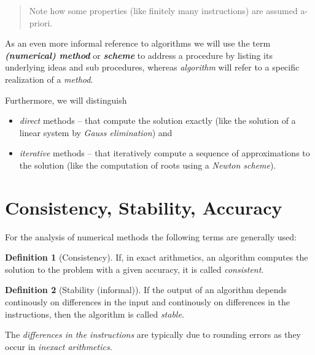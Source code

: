 \documentclass[
]{book}
\providecommand{\tightlist}{%
  \setlength{\itemsep}{0pt}\setlength{\parskip}{0pt}}
\newenvironment {JHSAYS} [0] {\begin{quote}\color{jhsc}} {\end{quote}}
\theoremstyle{definition}
\newtheorem{definition}{Definition}[chapter]
\theoremstyle{definition}
\theoremstyle{definition}
\theoremstyle{definition}
\theoremstyle{remark}
\begin{document}
\leavevmode\hypertarget{rem-coors}{}%
\begin{JHSAYS}
Note how some properties (like finitely many instructions) are assumed a-priori.

\end{JHSAYS}

As an even more informal reference to algorithms we will use the term \textbf{\emph{(numerical) method}} or \textbf{\emph{scheme}} to address a procedure by listing its underlying ideas and sub procedures, whereas \emph{algorithm} will refer to a specific realization of a \emph{method}.

Furthermore, we will distinguish

\begin{itemize}
\tightlist
\item
  \emph{direct} methods -- that compute the solution exactly (like the solution of a linear system by \emph{Gauss elimination}) and
\item
  \emph{iterative} methods -- that iteratively compute a sequence of approximations to the solution (like the computation of roots using a \emph{Newton scheme}).
\end{itemize}

\hypertarget{consistency-stability-accuracy}{%
\section{Consistency, Stability, Accuracy}\label{consistency-stability-accuracy}}

For the analysis of numerical methods the following terms are generally used:

\begin{definition}[Consistency]
\protect\hypertarget{def:consistency}{}\label{def:consistency}If, in exact arithmetics, an algorithm computes the solution to the problem with a given accuracy, it is called \emph{consistent}.
\end{definition}

\begin{definition}[Stability (informal)]
\protect\hypertarget{def:stability}{}\label{def:stability}If the output of an algorithm depends continously on differences in the input and continously on differences in the instructions, then the algorithm is called \emph{stable}.
\end{definition}

The \emph{differences in the instructions} are typically due to rounding errors as they occur in \emph{inexact arithmetics}.
\end{document}

